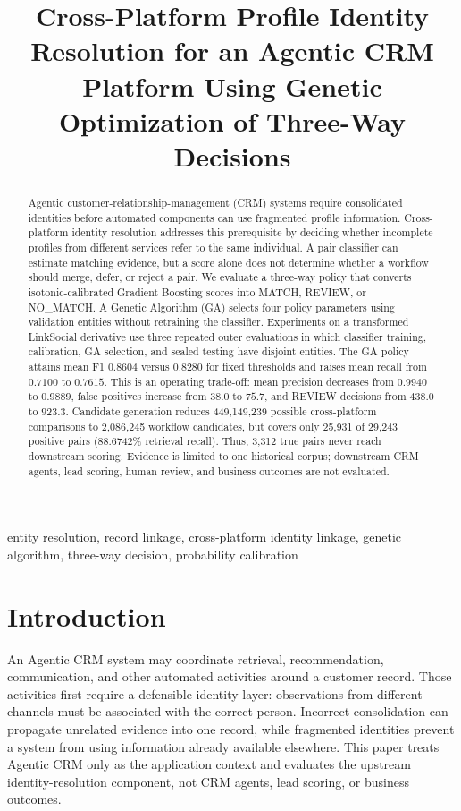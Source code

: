 \documentclass[conference]{IEEEtran}
\begin{document}
\title{Cross-Platform Profile Identity Resolution for an Agentic CRM Platform Using Genetic Optimization of Three-Way Decisions}
\author{}
\maketitle

\begin{abstract}
Agentic customer-relationship-management (CRM) systems require consolidated identities before automated components can use fragmented profile information. Cross-platform identity resolution addresses this prerequisite by deciding whether incomplete profiles from different services refer to the same individual. A pair classifier can estimate matching evidence, but a score alone does not determine whether a workflow should merge, defer, or reject a pair. We evaluate a three-way policy that converts isotonic-calibrated Gradient Boosting scores into MATCH, REVIEW, or NO\_MATCH. A Genetic Algorithm (GA) selects four policy parameters using validation entities without retraining the classifier. Experiments on a transformed LinkSocial derivative use three repeated outer evaluations in which classifier training, calibration, GA selection, and sealed testing have disjoint entities. The GA policy attains mean F1 $0.8604$ versus $0.8280$ for fixed thresholds and raises mean recall from $0.7100$ to $0.7615$. This is an operating trade-off: mean precision decreases from $0.9940$ to $0.9889$, false positives increase from $38.0$ to $75.7$, and REVIEW decisions from $438.0$ to $923.3$. Candidate generation reduces 449,149,239 possible cross-platform comparisons to 2,086,245 workflow candidates, but covers only 25,931 of 29,243 positive pairs (88.6742\% retrieval recall). Thus, 3,312 true pairs never reach downstream scoring. Evidence is limited to one historical corpus; downstream CRM agents, lead scoring, human review, and business outcomes are not evaluated.
\end{abstract}

\begin{IEEEkeywords}
entity resolution, record linkage, cross-platform identity linkage, genetic algorithm, three-way decision, probability calibration
\end{IEEEkeywords}

\section{Introduction}
An Agentic CRM system may coordinate retrieval, recommendation, communication, and other automated activities around a customer record. Those activities first require a defensible identity layer: observations from different channels must be associated with the correct person. Incorrect consolidation can propagate unrelated evidence into one record, while fragmented identities prevent a system from using information already available elsewhere. This paper treats Agentic CRM only as the application context and evaluates the upstream identity-resolution component, not CRM agents, lead scoring, or business outcomes.
\end{document}
